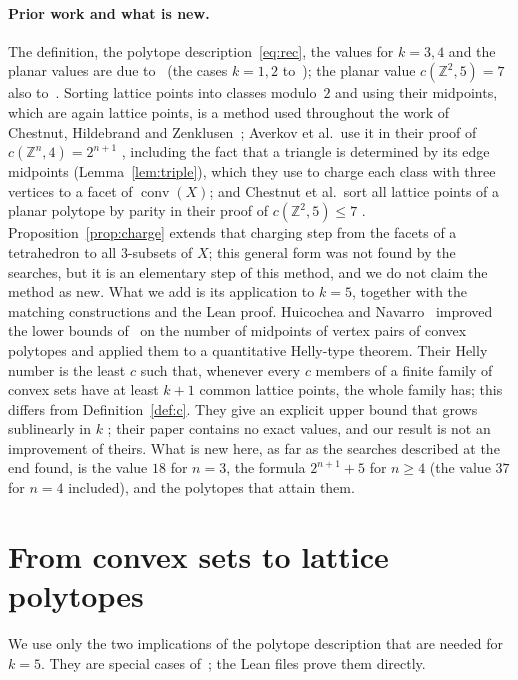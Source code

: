 \documentclass[11pt]{article}
\theoremstyle{definition}
\theoremstyle{remark}
\newcommand{\Z}{\mathbb Z}
\newcommand{\conv}{\operatorname{conv}}
\begin{document}
\paragraph{Prior work and what is new.}
The definition, the polytope description~\eqref{eq:rec}, the values for
$k=3,4$ and the planar values are due to~\cite{agm} (the cases $k=1,2$
to~\cite{abdl,chz}); the planar value $c(\Z^2,5)=7$
also to~\cite{chz}. Sorting lattice points into classes modulo~$2$ and using
their midpoints, which are again lattice points, is a method used throughout
the work of Chestnut, Hildebrand and Zenklusen~\cite[Sections~1 and~3]{chz};
Averkov et al.\ use it in their proof of $c(\Z^n,4)=2^{n+1}$
\cite[Section~5]{agm}, including the fact that a triangle is determined by its
edge midpoints (Lemma~\ref{lem:triple}), which they use to charge each class
with three vertices to a facet of $\conv(X)$; and Chestnut et al.\ sort all lattice points of a
planar polytope by parity in their proof of $c(\Z^2,5)\le7$
\cite[Lemma~5.2]{chz}. Proposition~\ref{prop:charge} extends that charging step from the facets of a
tetrahedron to all $3$-subsets of $X$; this general form was not found by the
searches, but it is an elementary step of this method, and we do not claim the
method as new. What we add is its application to $k=5$, together with the
matching constructions and the Lean proof.
Huicochea and Navarro~\cite{hn} improved the lower bounds of~\cite{chz} on
the number of midpoints of vertex pairs of convex polytopes and applied them to
a quantitative Helly-type theorem. Their Helly number is the least $c$ such that,
whenever every $c$ members of a finite family of convex sets have at least
$k+1$ common lattice points, the whole family has; this differs from
Definition~\ref{def:c}. They give an explicit upper bound that grows
sublinearly in $k$ \cite[Theorem~1.8]{hn}; their paper contains no exact values,
and our result is not an improvement of theirs. What is new here, as far as the
searches described at the end found, is the value $18$ for $n=3$, the
formula $2^{n+1}+5$ for $n\ge4$ (the value $37$ for $n=4$ included), and the
polytopes that attain them.

\section{From convex sets to lattice polytopes}\label{sec:reduction}

We use only the two implications of the polytope description that are needed
for $k=5$. They are special cases of~\cite[Theorem~2 and~(6)]{agm}; the Lean
files prove them directly.
\end{document}
